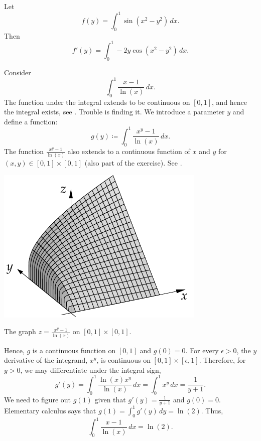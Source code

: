 \begin{example}
Let
\begin{equation*}
f(y) = \int_0^1 \sin(x^2-y^2) \,dx .
\end{equation*}
Then
\begin{equation*}
f'(y) = \int_0^1 -2y\cos(x^2-y^2) \,dx .
\end{equation*}
\end{example}

\begin{example} \label{example:counterexamplediffunder}
Consider
\begin{equation*}
\int_0^{1} \frac{x-1}{\ln(x)} \,dx .
\end{equation*}
The function under the integral 
extends to be continuous on $[0,1]$, and hence
the integral exists, see .  Trouble is finding it.
We introduce a parameter $y$
and define a function:
\begin{equation*}
g(y) \coloneqq \int_0^{1} \frac{x^y-1}{\ln(x)} \,dx .
\end{equation*}
The function
$\frac{x^y-1}{\ln(x)}$
also extends to a continuous function of $x$ and $y$
for $(x,y) \in [0,1] \times [0,1]$ (also part of the exercise).
See .
\begin{myfigureht}
\includegraphics{figures/diffunderexample}
\caption{The graph $z= \frac{x^y-1}{\ln(x)}$ on $[0,1] \times [0,1]$.\label{fig:diffunderexample}}
\end{myfigureht}


Hence,
$g$ is a continuous function on $[0,1]$ and $g(0) = 0$.
For every $\epsilon > 0$, the $y$ derivative of the integrand, $x^y$,
is continuous on $[0,1] \times [\epsilon,1]$.  Therefore,
for $y >0$, we may differentiate under the integral sign,
\begin{equation*}
g'(y) =
\int_0^{1} \frac{\ln(x) x^y}{\ln(x)} \,dx 
=
\int_0^{1} x^y \,dx =
\frac{1}{y+1} .
\end{equation*}
We need to figure out $g(1)$ given that $g'(y) = \frac{1}{y+1}$ and $g(0) =
0$.  Elementary calculus says that $g(1) = \int_0^1 g'(y)\,dy = \ln(2)$.
Thus,
\begin{equation*}
\int_0^{1} \frac{x-1}{\ln(x)} \,dx  = \ln(2).
\end{equation*}
\end{example}

